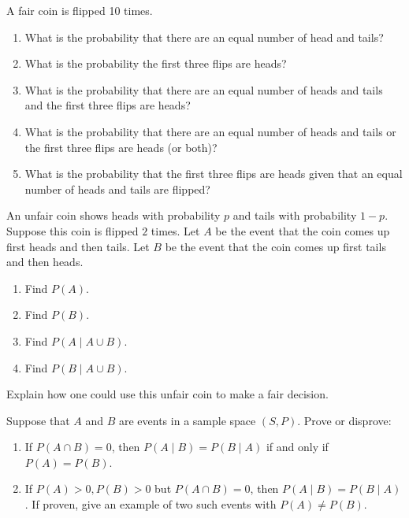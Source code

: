\documentclass{article}
\theoremstyle{definition}
\begin{document}
\begin{question}
        A fair coin is flipped 10 times.
    \begin{enumerate}
        \item What is the probability that there are an equal number of head and
            tails?
        \item What is the probability the first three flips are heads?
        \item What is the probability that there are an equal number of heads
            and tails and the first three flips are heads?
        \item What is the probability that there are an equal number of heads
            and tails or the first three flips are heads (or both)?
        \item What is the probability that the first three flips are heads given
            that an equal number of heads and tails are flipped?
    \end{enumerate}
\end{question}
\begin{solution}
\end{solution}

\begin{question}
    An unfair coin shows heads with probability $p$ and tails with probability
    $1-p$. Suppose this coin is flipped $2$ times. Let $A$ be the event that the coin comes up first heads and
    then tails.  Let $B$ be the event that the coin comes up first tails and
    then heads.
    \begin{enumerate}
        \item  Find $P(A)$.
        \item  Find $P(B)$.
        \item  Find $P(A \mid A \cup B)$.
        \item  Find $P(B \mid A \cup B)$.
    \end{enumerate}
    Explain how one could use this unfair coin to make a fair decision.
\end{question}
\begin{solution}
\end{solution}

\begin{question}
    Suppose that $A$ and $B$ are events in a sample space $(S,P)$.
    Prove or disprove:
    \begin{enumerate}
        \item If $P(A \cap B)=0$, then $P(A\mid B)=P(B\mid A)$ if and only
            if $P(A)=P(B)$.
        \item If $P(A)>0, P(B)>0$ but $P(A \cap B)=0$, then $P(A\mid
            B)=P(B\mid A)$.  If proven, give an example of two such events
            with $P(A) \ne P(B)$.
    \end{enumerate}
\end{question}
\begin{solution}
\end{solution}
\end{document}
